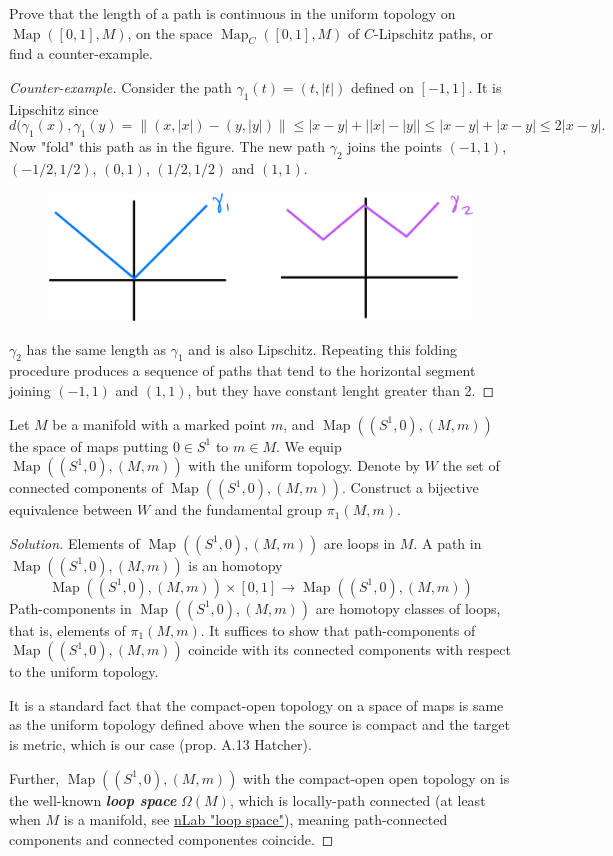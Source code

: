 \documentclass{article}
\DeclareMathOperator{\Map}{Map}
\begin{document}
\begin{exercise}
	Prove that the length of a path is continuous in the uniform topology on $\Map([0,1],M)$, on the space $\Map_C([0,1],M)$ of $C$-Lipschitz paths, or find a counter-example.
\end{exercise}
\begin{proof}[Counter-example]
	Consider the path $\gamma_1(t)=(t,|t|)$ defined on $[-1,1]$. It is Lipschitz since
	\[d(\gamma_1(x),\gamma_1(y)=\|(x,|x|)-(y,|y|)\|\leq|x-y|+\Big||x|-|y|\Big|\leq|x-y|+|x-y|\leq2|x-y|.\]
	Now "fold" this path as in the figure. The new path $\gamma_2$ joins the points $(-1,1)$, $(-1/2,1/2)$, $(0,1)$, $(1/2,1/2)$ and $(1,1)$.
	\begin{figure}[H]
		\centering
		\includegraphics[width=0.7\linewidth]{lip}
	\end{figure}
	$\gamma_2$ has the same length as $\gamma_1$ and is also Lipschitz. Repeating this folding procedure produces a sequence of paths that tend to the horizontal segment joining $(-1,1)$ and $(1,1)$, but they have constant lenght greater than 2.	
\end{proof}

\begin{exercise}
	Let $M$ be a manifold with a marked point $m$, and $\Map((S^1, 0), (M, m))$ the space of maps putting $0 \in S^1$ to $m \in M$. We equip $\Map((S^1, 0), (M, m))$ with the uniform topology. Denote by $W$ the set of connected components of $\Map((S^1,0),(M,m))$. Construct a bijective equivalence between $W$ and the fundamental group $\pi_1(M, m)$.
\end{exercise}
\begin{proof}[Solution]
	Elements of $\Map((S^1,0),(M,m))$ are loops in $M$. A path in $\Map((S^1,0),(M,m))$ is an homotopy
	\[\Map((S^1,0),(M,m))\times [0,1]\to \Map((S^1,0),(M,m))\]
	Path-components in $\Map((S^1,0),(M,m))$ are homotopy classes of loops, that is, elements of $\pi_1(M,m)$. It suffices to show that path-components of $\Map((S^1,0),(M,m))$ coincide with its connected components with respect to the uniform topology.
	
	It is a standard fact that the compact-open topology on a space of maps is same as the uniform topology defined above when the source is compact and the target is metric, which is our case (prop. A.13 Hatcher).
	
	Further, $\Map((S^1,0),(M,m))$ with the compact-open open topology on is the well-known \textbf{\textit{loop space}} $\Omega(M)$, which is locally-path connected (at least when $M$ is a manifold, see \href{https://ncatlab.org/nlab/show/loop+space}{nLab "loop space"}), meaning path-connected components and connected componentes coincide.
\end{proof}
\end{document}
